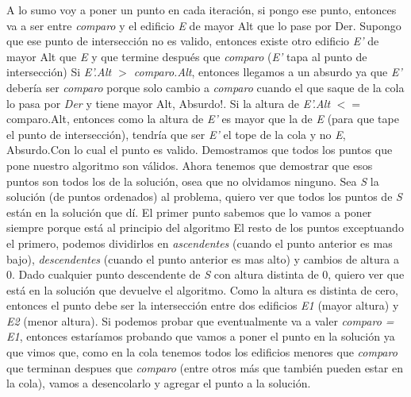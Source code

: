 \documentclass{article}
\begin{document}
A lo sumo voy a poner un punto en cada iteración, si pongo ese punto, entonces va a ser entre \textit{comparo} y el edificio \textit{E} de mayor Alt que lo pase por Der. Supongo que ese punto de intersección no es valido, entonces existe otro edificio \textit{E'} de mayor Alt que \textit{E} y que termine después que \textit{comparo} (\textit{E'} tapa al punto de intersección)
\newline
Si  \textit{E'.Alt $>$ comparo.Alt}, entonces llegamos a un absurdo ya que \textit{E'} debería ser \textit{comparo} porque solo cambio a \textit{comparo} cuando el que saque de la cola lo pasa por \textit{Der} y tiene mayor Alt, Absurdo!. 
Si la altura de \textit{E'.Alt} $<=$ comparo.Alt, entonces como la altura de \textit{E'} es mayor que la de \textit{E} (para que tape el punto de intersección), tendría que ser  \textit{E'} el tope de la cola y no \textit{E}, Absurdo.Con lo cual el punto es valido.\newline
Demostramos que todos los puntos que pone nuestro algoritmo son válidos.\newline
Ahora tenemos que demostrar que esos puntos son todos los de la solución, osea que no olvidamos ninguno.
Sea \textit{S} la solución (de puntos ordenados) al problema, quiero ver que todos los puntos de \textit{S} están en la solución que dí. 
El primer punto sabemos que lo vamos a poner siempre porque está al principio del algoritmo
El resto de los puntos exceptuando el primero, podemos dividirlos en \textit{ascendentes} (cuando el punto anterior es mas bajo), \textit{descendentes} (cuando el punto anterior es mas alto) y cambios de altura a 0.
Dado cualquier punto descendente de \textit{S} con altura distinta de 0, quiero ver que está en la solución que devuelve el algoritmo. Como la altura es distinta de cero, entonces el punto debe ser la intersección entre dos edificios \textit{E1} (mayor altura) y \textit{E2} (menor altura). Si podemos probar que eventualmente va a valer \textit{comparo = E1}, entonces estaríamos probando que vamos a poner el punto en la solución ya que vimos que, como en la cola tenemos todos los edificios menores que \textit{comparo} que terminan despues que \textit{comparo} (entre otros más que también pueden estar en la cola), vamos a desencolarlo y agregar el punto a la solución. \newline
\end{document}
